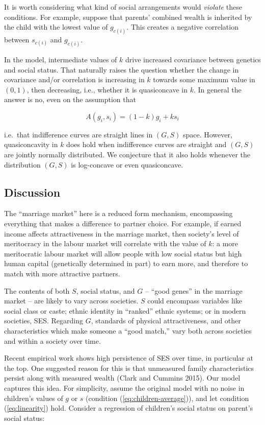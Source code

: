 \documentclass[
]{article}
\begin{document}
It is worth considering what kind of social arrangements would \emph{violate}
these conditions. For example, suppose that parents' combined wealth is
inherited by the child with the lowest value of \(g_{c(i)}\). This creates
a negative correlation between \(s_{c(i)}\) and \(g_{c(i)}\).

In the model, intermediate values of \(k\) drive increased covariance
between genetics and social status. That naturally raises the question
whether the change in covariance and/or correlation is increasing in \(k\)
towards some maximum value in \((0,1)\), then decreasing, i.e., whether it
is quasiconcave in \(k\). In general the answer is no, even on the
assumption that

\begin{equation}
A(g_{i},s_{i}) = (1-k)g_{i} + ks_{i}
\label{eq:linearity}
\end{equation}

i.e.~that indifference curves are straight lines in \((G, S)\) space.
However, quasiconcavity in \(k\) does hold when indifference curves are
straight and \((G, S)\) are jointly normally distributed. We conjecture
that it also holds whenever the distribution \((G, S)\) is log-concave or
even quasiconcave.

\hypertarget{discussion}{%
\subsection{Discussion}\label{discussion}}

The ``marriage market'' here is a reduced form mechanism, encompassing
everything that makes a difference to partner choice. For example, if
earned income affects attractiveness in the marriage market, then
society's level of meritocracy in the labour market will correlate with
the value of \(k\): a more meritocratic labour market will allow people
with low social status but high human capital (genetically determined in
part) to earn more, and therefore to match with more attractive
partners.

The contents of both \(S\), social status, and \(G\) -- ``good genes'' in the
marriage market -- are likely to vary across societies. \(S\) could
encompass variables like social class or caste; ethnic identity in
``ranked'' ethnic systems; or in modern societies, SES. Regarding \(G\),
standards of physical attractiveness, and other characteristics which
make someone a ``good match,'' vary both across societies and within a
society over time.

Recent empirical work shows high persistence of SES over time, in
particular at the top. One suggested reason for this is that unmeasured
family characteristics persist along with measured wealth
(Clark and Cummins 2015). Our model captures this idea. For
simplicity, assume the original model with no noise in children's values
of \(g\) or \(s\) (condition (\eqref{eq:children-average})), and let
condition (\eqref{eq:linearity}) hold. Consider a regression of
children's social status on parent's social status:
\end{document}
